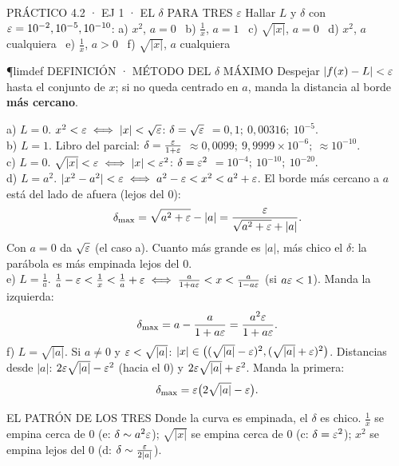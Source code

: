 \begin{enunciado}{PRÁCTICO 4.2 · EJ 1 · EL $\delta$ PARA TRES $\varepsilon$}
Hallar $L$ y $\delta$ con $\varepsilon=10^{-2},10^{-5},10^{-10}$: a) $x^2$, $a=0$ \ b) $\frac1x$, $a=1$ \ c) $\sqrt{|x|}$, $a=0$ \ d) $x^2$, $a$ cualquiera \ e) $\frac1x$, $a>0$ \ f) $\sqrt{|x|}$, $a$ cualquiera
\end{enunciado}
\begin{uso}{\P{limdef} DEFINICIÓN · MÉTODO DEL $\delta$ MÁXIMO}
Despejar $|f(x)-L|<\varepsilon$ hasta el conjunto de $x$; si no queda centrado en $a$, manda la distancia al borde \textbf{más cercano}.
\end{uso}
a) $L=0$. $x^2<\varepsilon\iff|x|<\sqrt{\varepsilon}$: $\delta=\sqrt{\varepsilon}$ $=0{,}1;\ 0{,}00316;\ 10^{-5}$.\\[2pt]
b) $L=1$. Libro del parcial: $\delta=\frac{\varepsilon}{1+\varepsilon}$ $\approx0{,}0099;\ 9{,}9999\times10^{-6};\ \approx10^{-10}$.\\[2pt]
c) $L=0$. $\sqrt{|x|}<\varepsilon\iff|x|<\varepsilon^2$: $\delta=\varepsilon^2$ $=10^{-4};\ 10^{-10};\ 10^{-20}$.\\[2pt]
d) $L=a^2$. $|x^2-a^2|<\varepsilon\iff a^2-\varepsilon<x^2<a^2+\varepsilon$. El borde más cercano a $a$ está del lado de afuera (lejos del 0):
\[\delta_{\max}=\sqrt{a^2+\varepsilon}-|a|=\frac{\varepsilon}{\sqrt{a^2+\varepsilon}+|a|}.\]
Con $a=0$ da $\sqrt{\varepsilon}$ (el caso a). Cuanto más grande es $|a|$, más chico el $\delta$: la parábola es más empinada lejos del 0.\\[2pt]
e) $L=\frac1a$. $\frac1a-\varepsilon<\frac1x<\frac1a+\varepsilon\iff\frac a{1+a\varepsilon}<x<\frac a{1-a\varepsilon}$ (si $a\varepsilon<1$). Manda la izquierda:
\[\delta_{\max}=a-\frac a{1+a\varepsilon}=\frac{a^2\varepsilon}{1+a\varepsilon}.\]
f) $L=\sqrt{|a|}$. Si $a\neq0$ y $\varepsilon<\sqrt{|a|}$: $|x|\in\big((\sqrt{|a|}-\varepsilon)^2,(\sqrt{|a|}+\varepsilon)^2\big)$. Distancias desde $|a|$: $2\varepsilon\sqrt{|a|}-\varepsilon^2$ (hacia el 0) y $2\varepsilon\sqrt{|a|}+\varepsilon^2$. Manda la primera:
\[\delta_{\max}=\varepsilon\big(2\sqrt{|a|}-\varepsilon\big).\]
\begin{tip}{EL PATRÓN DE LOS TRES}
Donde la curva es empinada, el $\delta$ es chico. $\frac1x$ se empina cerca de 0 (e: $\delta\sim a^2\varepsilon$); $\sqrt{|x|}$ se empina cerca de 0 (c: $\delta=\varepsilon^2$); $x^2$ se empina lejos del 0 (d: $\delta\sim\frac{\varepsilon}{2|a|}$).
\end{tip}

